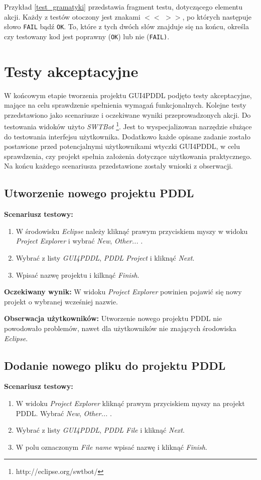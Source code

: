Przykład \ref{test_gramatyki} przedstawia fragment testu, dotyczącego elementu akcji. Każdy z testów otoczony jest znakami \texttt{$<<$} \texttt{$>>$}, po których następuje słowo \texttt{FAIL} bądź \texttt{OK}. To, które z tych dwóch słów znajduje się na końcu, określa czy testowany kod jest poprawny (\texttt{OK}) lub nie (\texttt{FAIL)}.




\section{Testy akceptacyjne}
W końcowym etapie tworzenia projektu GUI4PDDL podjęto testy akceptacyjne, mające na celu sprawdzenie spełnienia wymagań funkcjonalnych. Kolejne testy przedstawiono jako scenariusze i oczekiwane wyniki przeprowadzonych akcji. Do testowania widoków użyto \emph{SWTBot} \footnote{http://eclipse.org/swtbot/}. Jest to wyspecjalizowan narzędzie służące do testowania interfejsu użytkownika. Dodatkowo każde opisane zadanie zostało postawione przed potencjalnymi użytkownikami wtyczki GUI4PDDL, w celu sprawdzenia, czy projekt spełnia założenia dotyczące użytkowania praktycznego. Na końcu każdego scenariusza przedstawione zostały wnioski z obserwacji. 
\subsection{Utworzenie nowego projektu PDDL}
\textbf{Scenariusz testowy:}
  \begin{enumerate}
  
\item W środowisku \textit{Eclipse} należy kliknąć prawym przyciskiem myszy w widoku \textit{Project Explorer} i wybrać \textit{New}, \textit{Other...} .
\item Wybrać z listy \textit{GUI4PDDL}, \textit{PDDL Project} i kliknąć \textit{Next}.
\item Wpisać nazwę projektu i kilknąć \textit{Finish}.
\end{enumerate}

\textbf{Oczekiwany wynik:} W widoku \textit{Project Explorer} powinien pojawić się nowy projekt o wybranej wcześniej nazwie.

\textbf{Obserwacja użytkowników:} Utworzenie nowego projektu PDDL nie powodowało problemów, nawet dla użytkowników nie znających środowiska \textit{Eclipse}.
\subsection{Dodanie nowego pliku do projektu PDDL}
\textbf{Scenariusz testowy:}
  \begin{enumerate}
  
\item W widoku \textit{Project Explorer} kliknąć prawym przyciskiem myszy na projekt PDDL. Wybrać \textit{New}, \textit{Other...} .
\item Wybrać z listy \textit{GUI4PDDL}, \textit{PDDL File} i kliknąć \textit{Next}.
\item W polu oznaczonym \textit{File name} wpisać nazwę i kliknąć \textit{Finish}.
\end{enumerate}

